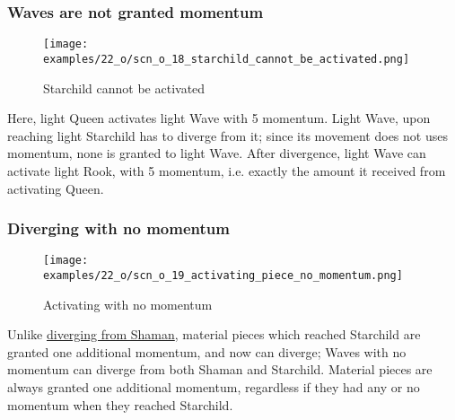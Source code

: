 \vspace*{-1.1\baselineskip}
\subsubsection*{Waves are not granted momentum}
\label{sec:One/Starchild/Divergence/Waves are not granted momentum}

\vspace*{-0.9\baselineskip}
\noindent
\begin{wrapfigure}[11]{l}{0.4\textwidth} %
\centering
\texttt{[image: examples/22\_o/scn\_o\_18\_starchild\_cannot\_be\_activated.png]}
\vspace*{-0.4\baselineskip}
\caption{Starchild cannot be activated}
\label{fig:scn_o_18_starchild_cannot_be_activated}
\end{wrapfigure}
Here, light Queen activates light Wave with 5 momentum. Light Wave, upon reaching
light Starchild has to diverge from it; since its movement does not uses momentum,
none is granted to light Wave. After divergence, light Wave can activate light Rook,
with 5 momentum, i.e. exactly the amount it received from activating Queen.

\vspace*{-1.1\baselineskip}
\subsubsection*{Diverging with no momentum}
\label{sec:One/Starchild/Divergence/Diverging with no momentum}

\vspace*{-0.9\baselineskip}
\noindent
\begin{wrapfigure}[7]{l}{0.4\textwidth}
\centering
\texttt{[image: examples/22\_o/scn\_o\_19\_activating\_piece\_no\_momentum.png]}
\vspace*{-0.4\baselineskip}
\caption{Activating with no momentum}
\label{fig:scn_o_19_activating_piece_no_momentum}
\end{wrapfigure}
Unlike \hyperref[fig:scn_cot_13_diverging_activated_piece_init]{diverging from Shaman},
material pieces which reached Starchild are granted one additional momentum, and now can
diverge; Waves with no momentum can diverge from both Shaman and Starchild. \newline
\indent
Material pieces are always granted one additional momentum, regardless if they had any
or no momentum when they reached Starchild.

